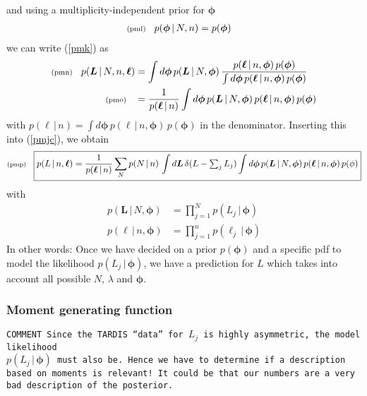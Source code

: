 \documentclass[11pt]{article}
\newcommand{\lleq}[1]{\label{#1} }
\renewcommand{\lleq}[1]{\label{#1} {\scriptstyle {\rm (#1)}} \hspace*{2ex} }
\newcommand{\cond}{\,|\,}
\newcommand{\bml}{{\bm{\ell}}}
\newcommand{\bmL}{{\bm{L}}}
\newcommand{\bmphi}{{\bm{\phi}}}
\begin{document}
and using a multiplicity-independent prior for $\bmphi$
\begin{align}
  \lleq{pml}
  p(\bmphi\cond N,n) &= p(\bmphi)
\end{align}
we can write (\ref{pmk}) as
\begin{align}
  \lleq{pmn}
  p(\bmL\cond N,n,\bml)
  &= \int d\bmphi\, p(\bmL\cond N,\bmphi)\, %
  \frac{p(\bml\cond n,\bmphi)\,p(\bmphi)} %
  {\int d\bmphi\,p(\bml\cond n,\bmphi)\,p(\bmphi)} \\
  \lleq{pmo}
  &= \frac{1}  {p(\bml\cond n)} %
  \int d\bmphi\, p(\bmL\cond N,\bmphi)\, %
  p(\bml\cond n,\bmphi)\,p(\bmphi)
\end{align}
with $p(\bml\cond n) = \int d\bmphi\, p(\bml\cond
n,\bmphi)\,p(\bmphi)$ in the denominator.
Inserting this into (\ref{pmjc}), we obtain
\begin{equation}
  \lleq{pmp}
  \boxed{
  p(L\cond n,\bml)
  = \frac{1}{p(\bml\cond n)}
  \sum_N p(N\cond n)\,\int d\bmL\,\delta(L - \textstyle\sum_j L_j)
  \displaystyle\int d\bmphi\,p(\bmL\cond N,\bmphi) \, p(\bml\cond n,\bmphi)
  \, p(\phi)
  }
\end{equation}
with
\begin{align}
  p(\bmL\cond N,\bmphi) &= \prod_{j=1}^N p(L_j\cond \bmphi) \\
  p(\bml\cond n,\bmphi) &= \prod_{j=1}^n p(\ell_j\cond \bmphi)
\end{align}
In other words: Once we have decided on a prior $p(\bmphi)$ and a
specific pdf to model the likelihood $p(L_j\cond \bmphi)$, we have a
prediction for $L$ which takes into account all possible $N$,
$\lambda$ and $\bmphi$.



\subsubsection{Moment generating function}
\label{sec:mgff}

\texttt{COMMENT Since the TARDIS ``data'' for $L_j$ is highly
  asymmetric, the model likelihood\\ $p(L_j\cond \bmphi)$ must also
  be. Hence we have to determine if a description based on moments is
  relevant! It could be that our numbers are a very bad description of
  the posterior.}
\\
\end{document}
